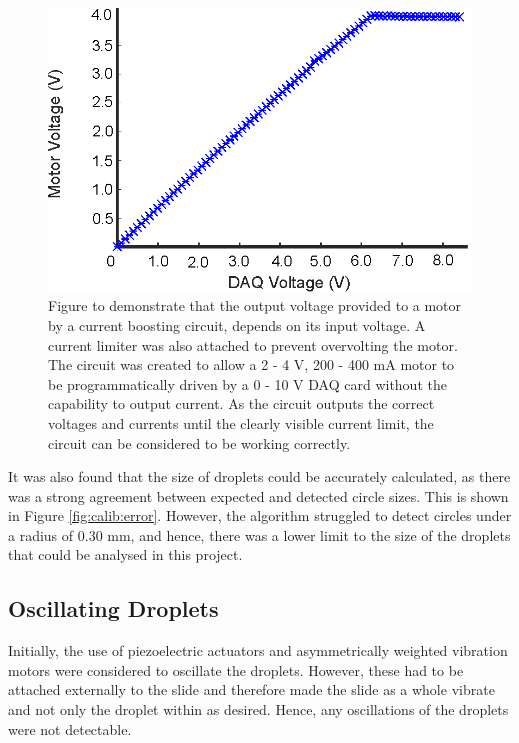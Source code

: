 \documentclass{physics_article_B}
\begin{document}
        \begin{figure}[H]
            \centering
            \hspace*{-1cm}\includegraphics{Figures/MotorCalib.eps}
            \caption{Figure to demonstrate that the output voltage provided to a motor by a current boosting circuit, depends on its input voltage. A current limiter was also attached to prevent overvolting the motor. The circuit was created to allow a 2 - 4 V, 200 - 400 mA motor to be programmatically driven by a 0 - 10 V DAQ card without the capability to output current. As the circuit outputs the correct voltages and currents until the clearly visible current limit, the circuit can be considered to be working correctly.}\label{fig:MotorCalib}
        \end{figure}
        
        It was also found that the size of droplets could be accurately calculated, as there was a strong agreement between expected and detected circle sizes. This is shown in Figure \ref{fig:calib:error}. However, the algorithm struggled to detect circles under a radius of 0.30 mm, and hence, there was a lower limit to the size of the droplets that could be analysed in this project.
        
        
    \subsection{Oscillating Droplets\label{sect:results:oscillation}}
      
        Initially, the use of piezoelectric actuators and asymmetrically weighted vibration motors were considered to oscillate the droplets. However, these had to be attached externally to the slide and therefore made the slide as a whole vibrate and not only the droplet within as desired. Hence, any oscillations of the droplets were not detectable.
        
\end{document}
